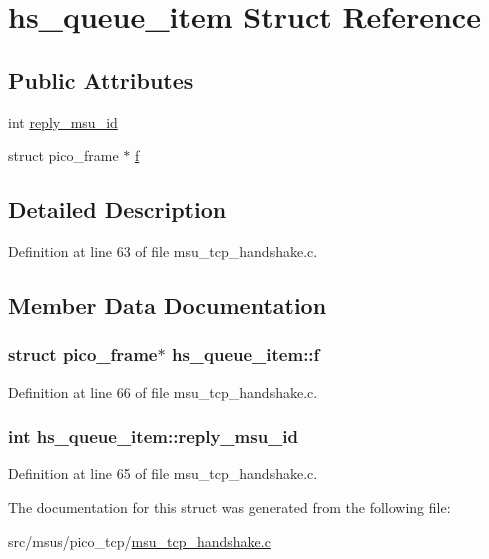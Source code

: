 \hypertarget{strucths__queue__item}{\section{hs\-\_\-queue\-\_\-item Struct Reference}
\label{strucths__queue__item}
}
\subsection*{Public Attributes}
\begin{DoxyCompactItemize}
\item 
int \hyperlink{strucths__queue__item_a99deece2eacf5bd67d0f72a1b967d1b4}{reply\-\_\-msu\-\_\-id}
\item 
struct pico\-\_\-frame $\ast$ \hyperlink{strucths__queue__item_a3f1a79a6198ed5adaccacd6804297bd7}{f}
\end{DoxyCompactItemize}


\subsection{Detailed Description}


Definition at line 63 of file msu\-\_\-tcp\-\_\-handshake.\-c.



\subsection{Member Data Documentation}
\hypertarget{strucths__queue__item_a3f1a79a6198ed5adaccacd6804297bd7}{
\subsubsection[{f}]{\setlength{\rightskip}{0pt plus 5cm}struct pico\-\_\-frame$\ast$ hs\-\_\-queue\-\_\-item\-::f}}\label{strucths__queue__item_a3f1a79a6198ed5adaccacd6804297bd7}


Definition at line 66 of file msu\-\_\-tcp\-\_\-handshake.\-c.

\hypertarget{strucths__queue__item_a99deece2eacf5bd67d0f72a1b967d1b4}{
\subsubsection[{reply\-\_\-msu\-\_\-id}]{\setlength{\rightskip}{0pt plus 5cm}int hs\-\_\-queue\-\_\-item\-::reply\-\_\-msu\-\_\-id}}\label{strucths__queue__item_a99deece2eacf5bd67d0f72a1b967d1b4}


Definition at line 65 of file msu\-\_\-tcp\-\_\-handshake.\-c.



The documentation for this struct was generated from the following file\-:\begin{DoxyCompactItemize}
\item 
src/msus/pico\-\_\-tcp/\hyperlink{msu__tcp__handshake_8c}{msu\-\_\-tcp\-\_\-handshake.\-c}\end{DoxyCompactItemize}
